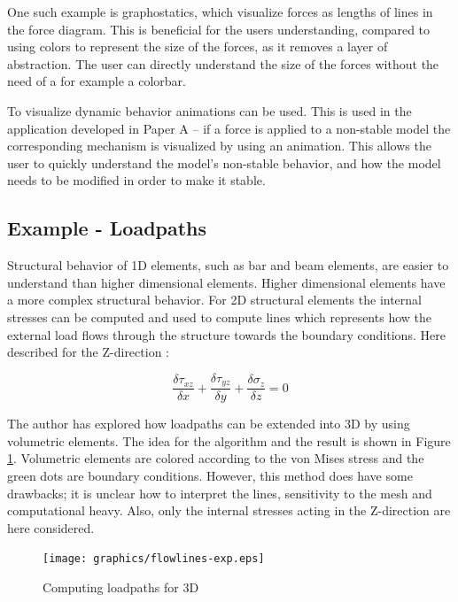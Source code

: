 One such example is graphostatics, which visualize forces as lengths of lines in the force diagram. This is beneficial for the users understanding, compared to using colors to represent the size of the forces, as it removes a layer of abstraction. The user can directly understand the size of the forces without the need of a for example a colorbar.

To visualize dynamic behavior animations can be used. This is used in the application developed in Paper A – if a force is applied to a non-stable model the corresponding mechanism is visualized by using an animation. This allows the user to quickly understand the model’s non-stable behavior, and how the model needs to be modified in order to make it stable. 

\subsection{Example - Loadpaths}
Structural behavior of 1D elements, such as bar and beam elements, are easier to understand than higher dimensional elements. Higher dimensional elements have a more complex structural behavior. For 2D structural elements the internal stresses can be computed and used to compute lines which represents how the external load flows through the structure towards the boundary conditions. Here described for the Z-direction \cite{Fonseca1997}:

\begin{equation*}
\frac{\delta \tau_{xz}}{\delta x} + \frac{\delta \tau_{yz}}{\delta y} + \frac{\delta \sigma_{z}}{\delta z}= 0
\end{equation*}

The author has explored how loadpaths can be extended into 3D by using volumetric elements. The idea for the algorithm and the result is shown in Figure \ref{fig:flowlines-exp}. Volumetric elements are colored according to the von Mises stress and the green dots are boundary conditions. However, this method does have some drawbacks; it is unclear how to interpret the lines, sensitivity to the mesh and computational heavy. Also, only the internal stresses acting in the Z-direction are here considered.
 
\begin{figure}
  \texttt{[image: graphics/flowlines-exp.eps]}
  \caption{Computing loadpaths for 3D}
  \label{fig:flowlines-exp}
\end{figure}




